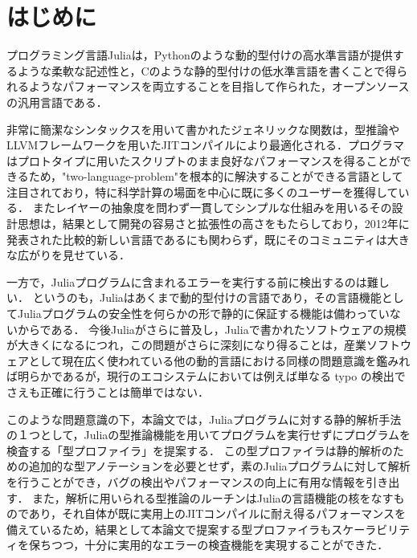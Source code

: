 
\section{はじめに}

プログラミング言語Juliaは，Pythonのような動的型付けの高水準言語が提供するような柔軟な記述性と，Cのような静的型付けの低水準言語を書くことで得られるようなパフォーマンスを両立することを目指して作られた，オープンソースの汎用言語である．

非常に簡潔なシンタックスを用いて書かれたジェネリックな関数は，型推論やLLVMフレームワークを用いたJITコンパイルにより最適化される．プログラマはプロトタイプに用いたスクリプトのまま良好なパフォーマンスを得ることができるため，"two-language-problem"\footnotemark を根本的に解決することができる言語として注目されており，特に科学計算の場面を中心に既に多くのユーザーを獲得している．
またレイヤーの抽象度を問わず一貫してシンプルな仕組みを用いるその設計思想は，結果として開発の容易さと拡張性の高さをもたらしており，2012年に発表された比較的新しい言語であるにも関わらず，既にそのコミュニティは大きな広がりを見せている．


一方で，Juliaプログラムに含まれるエラーを実行する前に検出するのは難しい．
というのも，Juliaはあくまで動的型付けの言語であり，その言語機能としてJuliaプログラムの安全性を何らかの形で静的に保証する機能は備わっていないからである．
今後Juliaがさらに普及し，Juliaで書かれたソフトウェアの規模が大きくになるにつれ，この問題がさらに深刻になり得ることは，産業ソフトウェアとして現在広く使われている他の動的言語における同様の問題意識を鑑みれば明らかであるが，現行のエコシステムにおいては例えば単なる typo の検出でさえも正確に行うことは簡単ではない．

このような問題意識の下，本論文では，Juliaプログラムに対する静的解析手法の１つとして，Juliaの型推論機能を用いてプログラムを実行せずにプログラムを検査する「型プロファイラ」を提案する．
この型プロファイラは静的解析のための追加的な型アノテーションを必要とせず，素のJuliaプログラムに対して解析を行うことができ，バグの検出やパフォーマンスの向上に有用な情報を引き出す．
また，解析に用いられる型推論のルーチンはJuliaの言語機能の核をなすものであり，それ自体が既に実用上のJITコンパイルに耐え得るパフォーマンスを備えているため，結果として本論文で提案する型プロファイラもスケーラビリティを保ちつつ，十分に実用的なエラーの検査機能を実現することができた．


